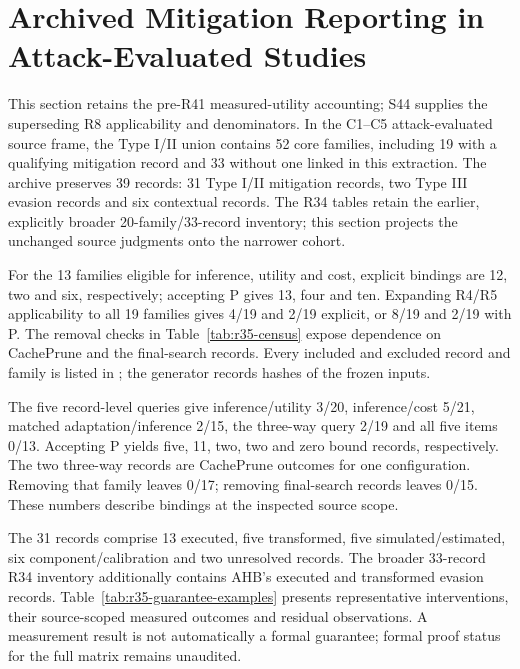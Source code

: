 \section{Archived Mitigation Reporting in Attack-Evaluated Studies}\label{sec:r35-census}
This section retains the pre-R41 measured-utility accounting; S44 supplies the superseding R8 applicability and denominators. In the C1--C5 attack-evaluated source frame, the Type I/II union contains 52 core families, including 19 with a qualifying mitigation record and 33 without one linked in this extraction. The archive preserves 39 records: 31 Type I/II mitigation records, two Type III evasion records and six contextual records. The R34 tables retain the earlier, explicitly broader 20-family/33-record inventory; this section projects the unchanged source judgments onto the narrower cohort.


For the 13 families eligible for inference, utility and cost, explicit bindings are 12, two and six, respectively; accepting P gives 13, four and ten. Expanding R4/R5 applicability to all 19 families gives 4/19 and 2/19 explicit, or 8/19 and 2/19 with P. The removal checks in Table~\ref{tab:r35-census} expose dependence on CachePrune and the final-search records. Every included and excluded record and family is listed in ; the generator records hashes of the frozen inputs.

The five record-level queries give inference/utility 3/20, inference/cost 5/21, matched adaptation/inference 2/15, the three-way query 2/19 and all five items 0/13. Accepting P yields five, 11, two, two and zero bound records, respectively. The two three-way records are CachePrune outcomes for one configuration. Removing that family leaves 0/17; removing final-search records leaves 0/15. These numbers describe bindings at the inspected source scope.

The 31 records comprise 13 executed, five transformed, five simulated/estimated, six component/calibration and two unresolved records. The broader 33-record R34 inventory additionally contains AHB's executed and transformed evasion records. Table~\ref{tab:r35-guarantee-examples} presents representative interventions, their source-scoped measured outcomes and residual observations. A measurement result is not automatically a formal guarantee; formal proof status for the full matrix remains unaudited.

